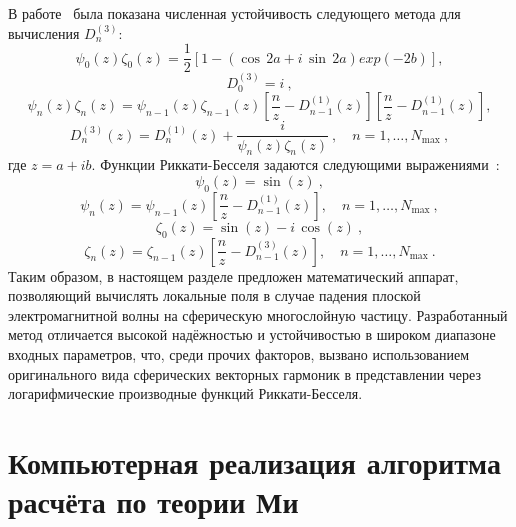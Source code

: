 В работе~\cite{Mackowski-1990} была показана численная устойчивость
следующего метода для вычисления $D_n^{(3)}$:
\begin{equation*}
  \label{eq:pena18a}
  \psi_0(z)\zeta_0(z)=\frac{1}{2}
\left[
1-(\cos\,2a+i\,\sin\,2a)exp(-2b)
\right],
\end{equation*}
\begin{equation*}
  \label{eq:pena18b}
D_0^{(3)} = i\:,
\end{equation*}
\begin{equation*}
  \label{eq:pena18c}
  \psi_n(z)\zeta_n(z)=   \psi_{n-1}(z)\zeta_{n-1}(z)
\left[
\frac{n}{z}-D_{n-1}^{(1)}(z)
\right]
\left[
\frac{n}{z}-D_{n-1}^{(1)}(z)
\right],
\end{equation*}
\begin{equation*}
  \label{eq:pena18d}
D_n^{(3)}(z) = D_n^{(1)}(z)+\frac{i}{\psi_n(z)\zeta_n(z)}\:,\quad
n=1,\ldots, N_{\max}\:,
\end{equation*}
где $z=a+ib$. Функции Риккати-Бесселя задаются следующими
выражениями~\cite{Wiscombe-1980,Mackowski-1990}:
\begin{equation*}
  \label{eq:pena20a}
  \psi_0(z) = \sin(z)\:,
\end{equation*}
\begin{equation*}
  \label{eq:pena20b}
\psi_n(z) = \psi_{n-1}(z)
\left[
\frac{n}{z}-D_{n-1}^{(1)}(z)
\right], \quad n=1,\ldots, N_{\max}\:,
\end{equation*}
\begin{equation*}
  \label{eq:pena21a}
\zeta_0(z) = \sin(z) - i\,\cos(z)\:,
\end{equation*}
\begin{equation*}
  \label{eq:pena21b}
\zeta_n(z) = \zeta_{n-1}(z)
\left[
\frac{n}{z}-D_{n-1}^{(3)}(z)
\right], \quad n=1,\ldots, N_{\max}\:.
\end{equation*}
Таким образом, в настоящем разделе предложен математический аппарат,
позволяющий вычислять локальные поля в случае падения плоской
электромагнитной волны на сферическую многослойную
частицу. Разработанный метод отличается высокой надёжностью и
устойчивостью в широком диапазоне входных параметров, что, среди
прочих факторов, вызвано использованием оригинального вида сферических
векторных гармоник в представлении через логарифмические производные
функций Риккати-Бесселя.


\section{Компьютерная реализация алгоритма расчёта по теории Ми}
\label{sec:code}

